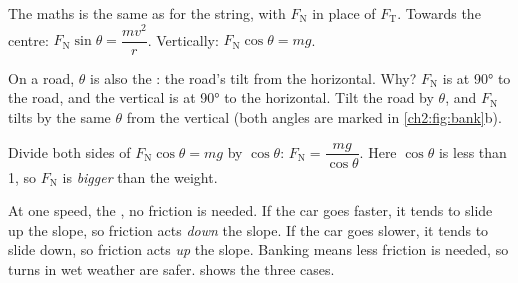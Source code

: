 The maths is the same as for the string, with $F_\mathrm{N}$ in place of $F_\mathrm{T}$.
Towards the centre: $F_\mathrm{N}\sin\theta = \dfrac{mv^2}{r}$. Vertically:
$F_\mathrm{N}\cos\theta = mg$.

On a road, $\theta$ is also the : the road's tilt from the horizontal. Why?
$F_\mathrm{N}$ is at \ang{90} to the road, and the vertical is at \ang{90} to the horizontal.
Tilt the road by $\theta$, and $F_\mathrm{N}$ tilts by the same $\theta$ from the vertical
(both angles are marked in \cref{ch2:fig:bank}b).

Divide both sides of $F_\mathrm{N}\cos\theta = mg$ by $\cos\theta$:
$F_\mathrm{N} = \dfrac{mg}{\cos\theta}$. Here $\cos\theta$ is less than 1, so $F_\mathrm{N}$ is
\emph{bigger} than the weight.

At one speed, the , no friction is needed. If the car goes faster, it
tends to slide up the slope, so friction acts \emph{down} the slope. If the car goes slower,
it tends to slide down, so friction acts \emph{up} the slope. Banking means less friction is
needed, so turns in wet weather are safer.  shows the three cases.

